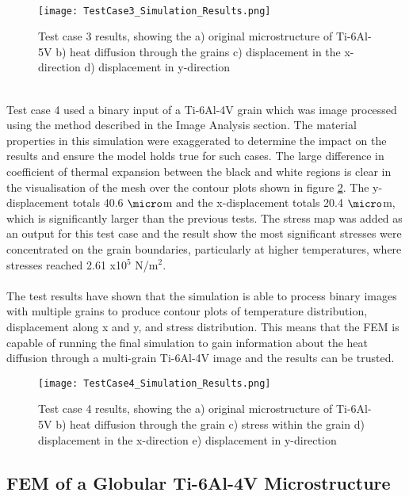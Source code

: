 \documentclass[report.tex]{subfiles}
\begin{document}
\\
\begin{figure}[htp]
    \centering
    \texttt{[image: TestCase3\_Simulation\_Results.png]}
    \caption{Test case 3 results, showing the a) original microstructure of Ti-6Al-5V b) heat diffusion through the grains c) displacement in the x-direction d) displacement in y-direction}
    \label{fig:TestCase3Results}
\end{figure}
\\
Test case 4 used a binary input of a Ti-6Al-4V grain which was image processed using the method described in the Image Analysis section. The material properties in this simulation were exaggerated to determine the impact on the results and ensure the model holds true for such cases. The large difference in coefficient of thermal expansion between the black and white regions is clear in the visualisation of the mesh over the contour plots shown in figure \ref{fig:TestCase4Results}. The y-displacement totals 40.6 $\micro$m and the x-displacement totals 20.4 $\micro$m, which is significantly larger than the previous tests. The stress map was added as an output for this test case and the result show the most significant stresses were concentrated on the grain boundaries, particularly at higher temperatures, where stresses reached 2.61 x10$^5$ N/m$^2$.\\
\\
The test results have shown that the simulation is able to process binary images with multiple grains to produce contour plots of temperature distribution, displacement along x and y, and stress distribution. This means that the FEM is capable of running the final simulation to gain information about the heat diffusion through a multi-grain Ti-6Al-4V image and the results can be trusted.
\\
\begin{figure}[htp]
    \centering
    \texttt{[image: TestCase4\_Simulation\_Results.png]}
    \caption{Test case 4 results, showing the a) original microstructure of Ti-6Al-5V b) heat diffusion through the grain c) stress within the grain d) displacement in the x-direction e) displacement in y-direction}
    \label{fig:TestCase4Results}
\end{figure}

\clearpage
\subsection{FEM of a Globular Ti-6Al-4V Microstructure}
\end{document}
